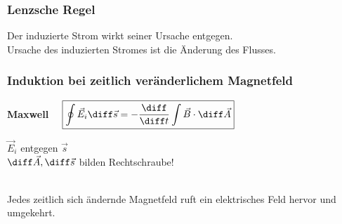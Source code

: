 	\begin{minipage}[t]{8cm}
		\subsubsection{Lenzsche Regel}
			Der induzierte Strom wirkt seiner Ursache entgegen.\\
			Ursache des induzierten Stromes ist die \"Anderung des Flusses.
	\end{minipage}
	\hspace{0.5cm}
	\begin{minipage}[t]{10cm}	
		\subsubsection{Induktion bei zeitlich veränderlichem Magnetfeld}
			\textbf{Maxwell}
			$\quad\boxed{\oint\vec{E}_i \diff \vec{s}=-\frac{\diff}{\diff t}\int \vec{B}\cdot \diff\vec{A}}\quad$
			\parbox{3.3cm}{\tiny{$\vec{E}_i$ entgegen $\vec{s}$\\
			$\diff \vec{A}, \diff \vec{s}$ bilden Rechtschraube!}}\\
			Jedes zeitlich sich ändernde Magnetfeld ruft ein elektrisches Feld hervor und umgekehrt.
	\end{minipage}


